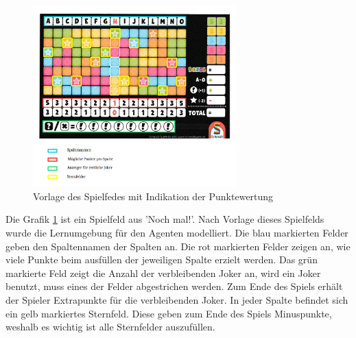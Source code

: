 \begin{figure}[!h]
	\centering
	\includegraphics[width=0.7\textwidth]{Bilder/Abbildung2.png}
	\caption{Vorlage des Spielfedes mit Indikation der Punktewertung 
	\cite{schmidt_spiele_gmbh_spielregeln_nodate}}
	\label{fig:Vorlage}
\end{figure}

Die Grafik \ref{fig:Vorlage} ist ein Spielfeld aus 'Noch mal!'. Nach Vorlage dieses Spielfelds wurde die Lernumgebung für den Agenten modelliert. Die blau markierten Felder geben den Spaltennamen der Spalten an. Die rot markierten Felder zeigen an, wie viele Punkte beim ausfüllen der jeweiligen Spalte erzielt werden. Das grün markierte Feld zeigt die Anzahl der verbleibenden Joker an, wird ein Joker benutzt, muss eines der Felder abgestrichen werden. Zum Ende des Spiels erhält der Spieler Extrapunkte für die verbleibenden Joker. In jeder Spalte befindet sich ein gelb markiertes Sternfeld. Diese geben zum Ende des Spiels Minuspunkte, weshalb es wichtig ist alle Sternfelder auszufüllen. 


\clearpage


